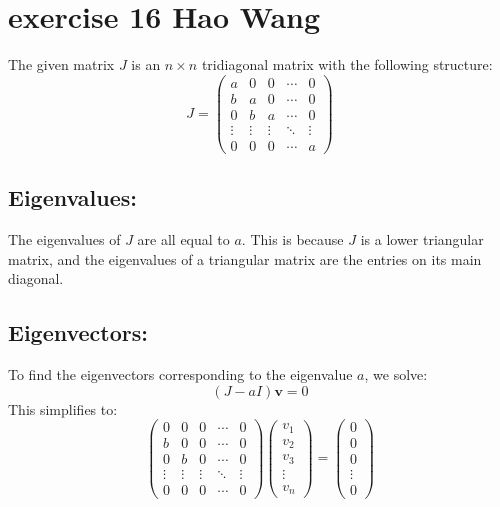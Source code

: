 \documentclass{article}
\begin{document}
\section{exercise 16 Hao Wang}

The given matrix \( J \) is an \( n \times n \) tridiagonal matrix with the following structure:
\[
    J = \begin{pmatrix}
        a      & 0      & 0      & \cdots & 0      \\
        b      & a      & 0      & \cdots & 0      \\
        0      & b      & a      & \cdots & 0      \\
        \vdots & \vdots & \vdots & \ddots & \vdots \\
        0      & 0      & 0      & \cdots & a
    \end{pmatrix}
\]

\subsection*{Eigenvalues:}
The eigenvalues of \( J \) are all equal to \( a \). This is because \( J \) is a lower triangular matrix, and the eigenvalues of a triangular matrix are the entries on its main diagonal.

\subsection*{Eigenvectors:}
To find the eigenvectors corresponding to the eigenvalue \( a \), we solve:
\[
    (J - a I) \mathbf{v} = 0
\]
This simplifies to:
\[
    \begin{pmatrix}
        0      & 0      & 0      & \cdots & 0      \\
        b      & 0      & 0      & \cdots & 0      \\
        0      & b      & 0      & \cdots & 0      \\
        \vdots & \vdots & \vdots & \ddots & \vdots \\
        0      & 0      & 0      & \cdots & 0
    \end{pmatrix}
    \begin{pmatrix}
        v_1    \\
        v_2    \\
        v_3    \\
        \vdots \\
        v_n
    \end{pmatrix}
    =
    \begin{pmatrix}
        0      \\
        0      \\
        0      \\
        \vdots \\
        0
    \end{pmatrix}
\]
\end{document}
